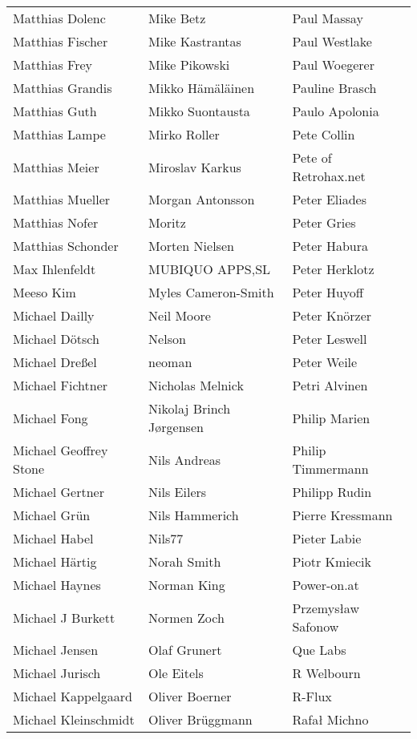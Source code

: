 \begin{tabular}{p{4.5cm}p{4.5cm}p{4.5cm}}
Matthias Dolenc & Mike Betz & Paul Massay \\
Matthias Fischer & Mike Kastrantas & Paul Westlake \\
Matthias Frey & Mike Pikowski & Paul Woegerer \\
Matthias Grandis & Mikko Hämäläinen & Pauline Brasch \\
Matthias Guth & Mikko Suontausta & Paulo Apolonia \\
Matthias Lampe & Mirko Roller & Pete Collin \\
Matthias Meier & Miroslav Karkus & Pete of Retrohax.net \\
Matthias Mueller & Morgan Antonsson & Peter Eliades \\
Matthias Nofer & Moritz & Peter Gries \\
Matthias Schonder & Morten Nielsen & Peter Habura \\
Max Ihlenfeldt & MUBIQUO APPS,SL & Peter Herklotz \\
Meeso Kim & Myles Cameron-Smith & Peter Huyoff \\
Michael Dailly & Neil Moore & Peter Knörzer \\
Michael Dötsch & Nelson & Peter Leswell \\
Michael Dreßel & neoman & Peter Weile \\
Michael Fichtner & Nicholas Melnick & Petri Alvinen \\
Michael Fong & Nikolaj Brinch Jørgensen & Philip Marien \\
Michael Geoffrey Stone & Nils Andreas & Philip Timmermann \\
Michael Gertner & Nils Eilers & Philipp Rudin \\
Michael Grün & Nils Hammerich & Pierre Kressmann \\
Michael Habel & Nils77 & Pieter Labie \\
Michael Härtig & Norah Smith & Piotr Kmiecik \\
Michael Haynes & Norman King & Power-on.at \\
Michael J Burkett & Normen Zoch & Przemysław Safonow \\
Michael Jensen & Olaf Grunert & Que Labs \\
Michael Jurisch & Ole Eitels & R Welbourn \\
Michael Kappelgaard & Oliver Boerner & R-Flux \\
Michael Kleinschmidt & Oliver Brüggmann & Rafał Michno \\

\end{tabular}

